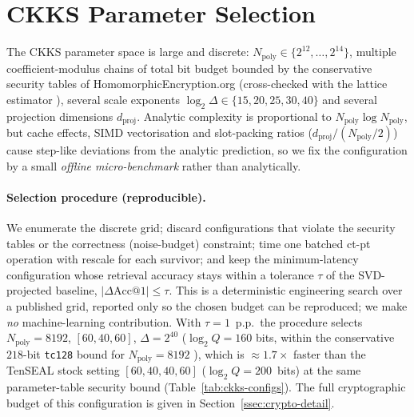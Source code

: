 \documentclass[11pt,a4paper]{article}
\begin{document}
\section{CKKS Parameter Selection}\label{sec:autotune}

The CKKS parameter space is large and discrete:
$N_{\mathrm{poly}} \in \{2^{12}, \dots, 2^{14}\}$, multiple
coefficient-modulus chains of total bit budget bounded by the
conservative security tables of HomomorphicEncryption.org
\cite{ref_he_std} (cross-checked with the lattice estimator
\cite{ref_lwe_estimator}), several scale exponents
$\log_2 \Delta \in \{15, 20, 25, 30, 40\}$ and several projection
dimensions $d_{\mathrm{proj}}$. Analytic complexity is proportional to
$N_{\mathrm{poly}} \log N_{\mathrm{poly}}$, but cache effects, SIMD
vectorisation and slot-packing ratios
($d_{\mathrm{proj}} / (N_{\mathrm{poly}}/2)$) cause step-like deviations
from the analytic prediction, so we fix the configuration by a small
\emph{offline micro-benchmark} rather than analytically.

\paragraph{Selection procedure (reproducible).} We enumerate the discrete
grid; discard configurations that violate the security tables or the
correctness (noise-budget) constraint; time one batched ct-pt operation with
rescale for each survivor; and keep the minimum-latency configuration whose
retrieval accuracy stays within a tolerance $\tau$ of the SVD-projected
baseline, $|\Delta\mathrm{Acc@1}| \leq \tau$. This is a deterministic
engineering search over a published grid, reported only so the chosen budget
can be reproduced; we make \emph{no} machine-learning contribution. With
$\tau = 1$~p.p.\ the procedure selects $N_{\mathrm{poly}} = 8192$,
$[60, 40, 60]$, $\Delta = 2^{40}$ ($\log_2 Q = 160$ bits, within the
conservative $218$-bit \texttt{tc128} bound for $N_{\mathrm{poly}} = 8192$
\cite{ref_he_std,ref_lwe_estimator}), which is $\approx 1.7\times$ faster than
the TenSEAL stock setting $[60, 40, 40, 60]$ ($\log_2 Q = 200$~bits) at the
same parameter-table security bound (Table~\ref{tab:ckks-configs}). The full
cryptographic budget of this configuration is given in
Section~\ref{ssec:crypto-detail}.
\end{document}
